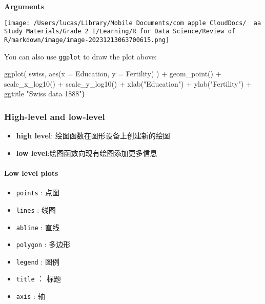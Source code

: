 \documentclass[
]{article}
\let\oldincludegraphics\includegraphics
\renewcommand{\includegraphics}[2][]{\begin{center}\oldincludegraphics[#1]{#2}\end{center}}
\newenvironment{Shaded}{}{}
\newcommand{\AttributeTok}[1]{\textcolor[rgb]{0.49,0.56,0.16}{#1}}
\newcommand{\ErrorTok}[1]{\textcolor[rgb]{1.00,0.00,0.00}{\textbf{#1}}}
\newcommand{\FunctionTok}[1]{\textcolor[rgb]{0.02,0.16,0.49}{#1}}
\newcommand{\NormalTok}[1]{#1}
\newcommand{\SpecialCharTok}[1]{\textcolor[rgb]{0.25,0.44,0.63}{#1}}
\newcommand{\StringTok}[1]{\textcolor[rgb]{0.25,0.44,0.63}{#1}}
\begin{document}
\textbf{Arguments}

\texttt{[image: /Users/lucas/Library/Mobile Documents/com~apple~CloudDocs/~~aa Study Materials/Grade 2 I/Learning/R for Data Science/Review of R/markdown/image/image-20231213063700615.png]}

You can also use \texttt{ggplot} to draw the plot above:

\begin{Shaded}
\begin{Highlighting}[]
\FunctionTok{ggplot}\NormalTok{( }
\NormalTok{  swiss, }
  \FunctionTok{aes}\NormalTok{(}\AttributeTok{x =}\NormalTok{ Education, }\AttributeTok{y =}\NormalTok{ Fertility) }
\NormalTok{) }\SpecialCharTok{+} 
\FunctionTok{geom\_point}\NormalTok{() }\SpecialCharTok{+} 
\FunctionTok{scale\_x\_log10}\NormalTok{() }\SpecialCharTok{+} 
\FunctionTok{scale\_y\_log10}\NormalTok{() }\SpecialCharTok{+} 
\FunctionTok{xlab}\NormalTok{(}\StringTok{"Education"}\NormalTok{) }\SpecialCharTok{+} 
\FunctionTok{ylab}\NormalTok{(}\StringTok{"Fertility"}\NormalTok{) }\SpecialCharTok{+} 
\NormalTok{ggtitle }\StringTok{"Swiss data 1888"}\ErrorTok{)}
\end{Highlighting}
\end{Shaded}

\hypertarget{high-level-and-low-level}{%
\subsubsection{High-level and
low-level}\label{high-level-and-low-level}}

\begin{itemize}
\item
  \textbf{high level}: 绘图函数在图形设备上创建新的绘图
\item
  \textbf{low level}:绘图函数向现有绘图添加更多信息
\end{itemize}

\hypertarget{low-level-plots}{%
\paragraph{Low level plots}\label{low-level-plots}}

\begin{itemize}
\item
  \texttt{points} : 点图
\item
  \texttt{lines} : 线图
\item
  \texttt{abline} : 直线
\item
  \texttt{polygon} : 多边形
\item
  \texttt{legend} : 图例
\item
  \texttt{title} ： 标题
\item
  \texttt{axis} : 轴
\end{itemize}
\end{document}
